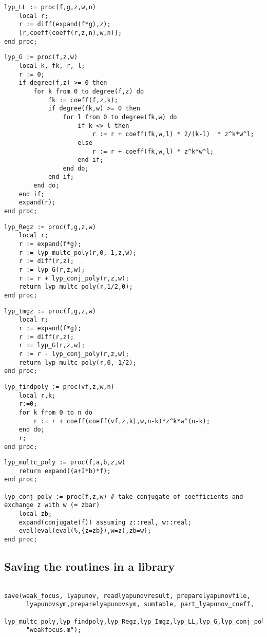 \documentclass[a4paper,10pt]{article}
\begin{document}
\begin{lstlisting}[name=weakfocus]
lyp_LL := proc(f,g,z,w,n)
    local r;
    r := diff(expand(f*g),z);
    [r,coeff(coeff(r,z,n),w,n)];
end proc;
\end{lstlisting}

\begin{lstlisting}[name=weakfocus]
lyp_G := proc(f,z,w)
    local k, fk, r, l;
    r := 0;
    if degree(f,z) >= 0 then
        for k from 0 to degree(f,z) do
            fk := coeff(f,z,k);
            if degree(fk,w) >= 0 then
                for l from 0 to degree(fk,w) do
                    if k <> l then
                        r := r + coeff(fk,w,l) * 2/(k-l)  * z^k*w^l;
                    else
                        r := r + coeff(fk,w,l) * z^k*w^l;
                    end if;
                end do;
            end if;
        end do;
    end if;
    expand(r);
end proc;
\end{lstlisting}

\begin{lstlisting}[name=weakfocus]
lyp_Regz := proc(f,g,z,w)
    local r;
    r := expand(f*g);
    r := lyp_multc_poly(r,0,-1,z,w);
    r := diff(r,z);
    r := lyp_G(r,z,w);
	r := r + lyp_conj_poly(r,z,w);
    return lyp_multc_poly(r,1/2,0);
end proc;
\end{lstlisting}

\begin{lstlisting}[name=weakfocus]
lyp_Imgz := proc(f,g,z,w)
    local r;
    r := expand(f*g);
    r := diff(r,z);
    r := lyp_G(r,z,w);
	r := r - lyp_conj_poly(r,z,w);
    return lyp_multc_poly(r,0,-1/2);
end proc;
\end{lstlisting}

\begin{lstlisting}[name=weakfocus]
lyp_findpoly := proc(vf,z,w,n)
    local r,k;
    r:=0;
    for k from 0 to n do
        r := r + coeff(coeff(vf,z,k),w,n-k)*z^k*w^(n-k);
    end do;
    r;
end proc;

\end{lstlisting}

\begin{lstlisting}[name=weakfocus]
lyp_multc_poly := proc(f,a,b,z,w)
    return expand((a+I*b)*f);
end proc;

lyp_conj_poly := proc(f,z,w) # take conjugate of coefficients and exchange z with w (= zbar)
    local zb;
    expand(conjugate(f)) assuming z::real, w::real;
    eval(eval(eval(%,{z=zb}),w=z),zb=w);
end proc;
\end{lstlisting}

\subsection{Saving the routines in a library}

\begin{lstlisting}[name=weakfocus]

save(weak_focus, lyapunov, readlyapunovresult, preparelyapunovfile,
      lyapunovsym,preparelyapunovsym, sumtable, part_lyapunov_coeff,
      lyp_multc_poly,lyp_findpoly,lyp_Regz,lyp_Imgz,lyp_LL,lyp_G,lyp_conj_poly,
      "weakfocus.m");

\end{lstlisting}
\end{document}
